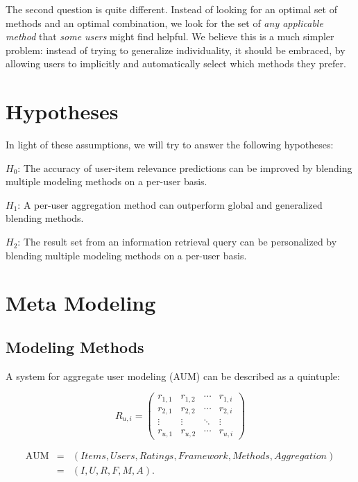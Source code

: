 The second question is quite different. 
Instead of looking for an optimal set of methods and an optimal combination,
we look for the set of \emph{any applicable method} that \emph{some users} might find helpful.
We believe this is a much simpler problem: 
instead of trying to generalize individuality,
it should be embraced, by allowing users to implicitly and automatically select which methods they prefer.


\section{Hypotheses}

In light of these assumptions, we will try to answer the following hypotheses:

$H_{0}$: The accuracy of user-item relevance predictions can be improved
by blending multiple modeling methods on a per-user basis.

$H_{1}$: A per-user aggregation method can outperform global and generalized 
blending methods.

$H_{2}$: The result set from an information retrieval query
can be personalized by blending multiple modeling methods on a per-user basis.




\section{Meta Modeling}

\subsection{Modeling Methods}

A system for aggregate user modeling (AUM) can be described as a quintuple:

\begin{equation*}
 R_{u,i} =
 \begin{pmatrix}
  r_{1,1} & r_{1,2} & \cdots & r_{1,i} \\
  r_{2,1} & r_{2,2} & \cdots & r_{2,i} \\
  \vdots  & \vdots  & \ddots & \vdots  \\
  r_{u,1} & r_{u,2} & \cdots & r_{u,i}
 \end{pmatrix}
\end{equation*}

\begin{eqnarray*}
  \mathrm{AUM} &=& (Items, Users, Ratings, Framework, Methods, Aggregation)\\
               &=& (I,U,R,F,M,A).
\end{eqnarray*}


